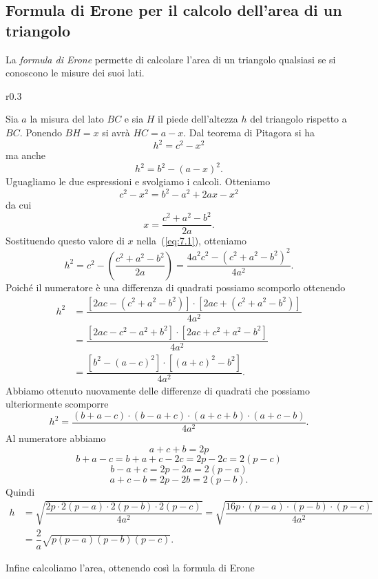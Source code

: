 \subsection{Formula di Erone per il calcolo dell'area di un triangolo}

La \emph{formula di Erone} permette di calcolare l'area di un triangolo qualsiasi se si conoscono le misure dei suoi lati.

\pagebreak

\begin{wrapfigure}{r}{0.3\textwidth}
	\centering
\end{wrapfigure}
Sia $a$ la misura del lato $BC$ e sia $H$ il piede dell'altezza $h$ del triangolo rispetto a $BC$. Ponendo $BH = x$ si avrà $HC = a - x$.
Dal teorema di Pitagora si ha
\begin{equation}\label{eq:7.1}
h^2=c^2-x^2
\end{equation}
ma anche
\[h^2=b^2-(a-x)^2.\]
Uguagliamo le due espressioni e svolgiamo i calcoli. Otteniamo
\[c^2-x^2=b^2-a^2+2ax-x^2\]
da cui
\[x=\dfrac{c^2+a^2-b^2}{2a}.\]
Sostituendo questo valore di $x$ nella~(\ref{eq:7.1}), otteniamo
\[h^2=c^2-\left(\dfrac{c^2+a^2-b^2}{2a}\right)=\dfrac{4a^2c^2-\left(c^2+a^2-b^2\right)^2}{4a^2}.\]
Poiché il numeratore è una differenza di quadrati possiamo scomporlo ottenendo
\begin{align*}
h^2&=\dfrac{\left[2ac-\left(c^2+a^2-b^2\right)\right]\cdot\left[2ac+\left(c^2+a^2-b^2\right)\right]}{4a^2}\\
&=\dfrac{\left[2ac-c^2-a^2+b^2\right]\cdot\left[2ac+c^2+a^2-b^2\right]}{4a^2}\\
&=\dfrac{\left[b^2-(a-c)^2\right]\cdot\left[(a+c)^2-b^2\right]}{4a^2}.
\end{align*}
Abbiamo ottenuto nuovamente delle differenze di quadrati che possiamo ulteriormente scomporre
\[h^2=\dfrac{(b+a-c)\cdot(b-a+c)\cdot(a+c+b)\cdot(a+c-b)}{4a^2}.\]
Al numeratore abbiamo
\[a + c + b = 2p\]
\[b + a - c = b+a+c-2c = 2p-2c = 2(p-c)\]
\[b - a + c = 2p - 2a = 2 (p - a)\]
\[a + c - b = 2p - 2b = 2(p - b).\]
Quindi
\begin{align*}
h&=\sqrt{\dfrac{2p\cdot 2(p-a) \cdot 2(p-b) \cdot 2(p-c)}{4a^2}}=\sqrt{\dfrac{16p\cdot (p-a) \cdot (p-b) \cdot (p-c)}{4a^2}}\\
&=\dfrac{2}{a}\sqrt{p(p-a)(p-b)(p-c)}.
\end{align*}

Infine calcoliamo l'area, ottenendo così la formula di Erone

